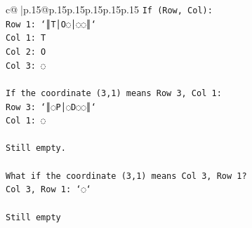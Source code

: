 \documentclass{article}
\begin{document}
{\begin{supertabular}{c@{$\;$}|p{.15\linewidth}@{}p{.15\linewidth}p{.15\linewidth}p{.15\linewidth}p{.15\linewidth}p{.15\linewidth}}
{{{\texttt{If (Row, Col):} \\
\texttt{Row 1: `║T│O◌│◌◌║`} \\
\texttt{Col 1: T} \\
\texttt{Col 2: O} \\
\texttt{Col 3: ◌} \\
\\ 
\texttt{If the coordinate (3,1) means Row 3, Col 1:} \\
\texttt{Row 3: `║◌P│◌D◌◌║`} \\
\texttt{Col 1: ◌} \\
\\ 
\texttt{Still empty.} \\
\\ 
\texttt{What if the coordinate (3,1) means Col 3, Row 1?} \\
\texttt{Col 3, Row 1: `◌`} \\
\\ 
\texttt{Still empty} \\
            }
        }
    }
     \\ \\


\end{supertabular}}
\end{document}
